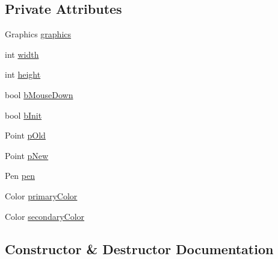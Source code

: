 \subsection*{Private Attributes}
\begin{DoxyCompactItemize}
\item 
Graphics \mbox{\hyperlink{class_paint___program_1_1_straight_line_tool_a53a533731323ed3ffccce9c5b15e9918}{graphics}}
\item 
int \mbox{\hyperlink{class_paint___program_1_1_straight_line_tool_a5028852803a8d10f33cce71589b30a2c}{width}}
\item 
int \mbox{\hyperlink{class_paint___program_1_1_straight_line_tool_ac007cc9dcf0627d4f2c2da052c474147}{height}}
\item 
bool \mbox{\hyperlink{class_paint___program_1_1_straight_line_tool_a9f2f208b0bb6fd29b50f61390ba09bd1}{b\+Mouse\+Down}}
\item 
bool \mbox{\hyperlink{class_paint___program_1_1_straight_line_tool_a154b1cbdbf670e351aa6ed3b038ab149}{b\+Init}}
\item 
Point \mbox{\hyperlink{class_paint___program_1_1_straight_line_tool_a596c7efe86fcedf508afa1bcbc339aad}{p\+Old}}
\item 
Point \mbox{\hyperlink{class_paint___program_1_1_straight_line_tool_ad1bf03a5aff488c8668389bd74f50f66}{p\+New}}
\item 
Pen \mbox{\hyperlink{class_paint___program_1_1_straight_line_tool_aa54a4ef4085b40fd4892d1605dc136a9}{pen}}
\item 
Color \mbox{\hyperlink{class_paint___program_1_1_straight_line_tool_acdde166c5368a662c45af2d92a8a4ea5}{primary\+Color}}
\item 
Color \mbox{\hyperlink{class_paint___program_1_1_straight_line_tool_adf26467b59d71c4f15653a7fbafe348e}{secondary\+Color}}
\end{DoxyCompactItemize}


\subsection{Constructor \& Destructor Documentation}
\mbox{\label{class_paint___program_1_1_straight_line_tool_a4e09ab9bf0ef819ed906bfe82d9b76cf}} 
